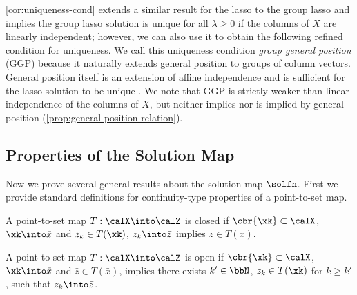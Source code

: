\cref{cor:uniqueness-cond} extends a similar result for the lasso
to the group lasso \citep[Eq. 9]{tibshirani2013unique} and
implies the group lasso solution is unique for all \( \lambda \geq 0 \) if
the columns of \( X \) are linearly independent;
however, we can also use it to obtain the following refined condition
for uniqueness.
We call this uniqueness condition \emph{group general position}
(GGP) because it naturally extends general position to groups of column vectors.
General position itself is an extension of affine independence and is sufficient for the lasso solution
to be unique \citep{tibshirani2013unique}.
We note that GGP is strictly weaker than linear independence of the columns of \( X \),
but neither implies nor is implied by general position (\cref{prop:general-position-relation}).

\subsection{Properties of the Solution Map}

Now we prove several general results about the solution map \( \solfn \).
First we provide standard definitions for continuity-type properties of
a point-to-set map.

\begin{definition}
	A point-to-set map \( T : \calX \into \calZ \) is closed if
	\( \cbr{\xk} \subset \calX \), \( \xk \into \bar x \) and \( z_k \in T(\xk) \),
	\( z_k \into \bar z \) implies \( \bar z \in T(\bar x) \).
\end{definition}

\begin{definition}
	A point-to-set map \( T : \calX \into \calZ \) is open if
	\( \cbr{\xk} \subset \calX \), \( \xk \into \bar x \) and \( \bar z \in T(\bar x) \),
	implies there exists \( k' \in \bbN \), \( z_k \in T(\xk) \) for \( k \geq k' \),
	such that \( z_k \into \bar z \).
\end{definition}

